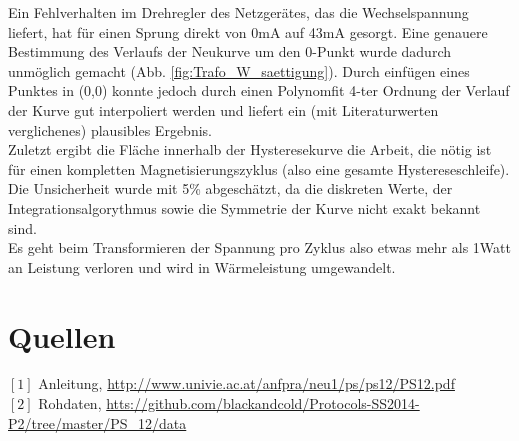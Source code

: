 \documentclass[12pt,a4paper]{article}
\begin{document}
\begin{multicols}{2}
Ein Fehlverhalten im Drehregler des Netzgerätes, das die Wechselspannung liefert, hat  für einen Sprung direkt von 0mA auf 43mA gesorgt. Eine genauere Bestimmung des Verlaufs der Neukurve um den 0-Punkt wurde dadurch unmöglich gemacht (Abb. \ref{fig:Trafo_W_saettigung}). Durch einfügen eines Punktes in (0,0) konnte jedoch durch einen Polynomfit 4-ter Ordnung der Verlauf der Kurve gut interpoliert werden und liefert ein (mit Literaturwerten verglichenes) plausibles Ergebnis.\\

Zuletzt ergibt die Fläche innerhalb der Hysteresekurve die Arbeit, die nötig ist für einen kompletten Magnetisierungszyklus (also eine gesamte Hystereseschleife).\\
Die Unsicherheit wurde mit 5\% abgeschätzt, da die diskreten Werte, der Integrationsalgorythmus sowie die Symmetrie der Kurve nicht exakt bekannt sind.\\
Es geht beim Transformieren der Spannung pro Zyklus also etwas mehr als 1Watt an Leistung verloren und wird in Wärmeleistung umgewandelt.


\section{Quellen}
$[1]$ Anleitung, \url{http://www.univie.ac.at/anfpra/neu1/ps/ps12/PS12.pdf}\\
$[2]$ Rohdaten, \url{htts://github.com/blackandcold/Protocols-SS2014-P2/tree/master/PS_12/data}\\

\end{multicols}
\end{document}

